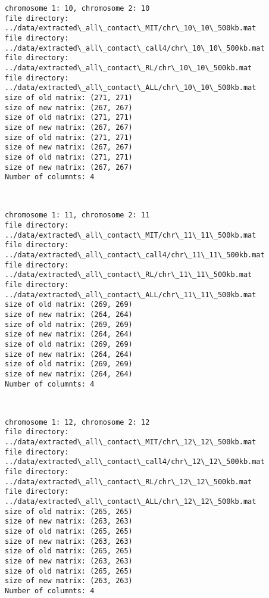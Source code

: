 \documentclass[11pt]{article}
\begin{document}
    \begin{Verbatim}[commandchars=\\\{\}]
chromosome 1: 10, chromosome 2: 10
file directory: ../data/extracted\_all\_contact\_MIT/chr\_10\_10\_500kb.mat
file directory: ../data/extracted\_all\_contact\_call4/chr\_10\_10\_500kb.mat
file directory: ../data/extracted\_all\_contact\_RL/chr\_10\_10\_500kb.mat
file directory: ../data/extracted\_all\_contact\_ALL/chr\_10\_10\_500kb.mat
size of old matrix: (271, 271)
size of new matrix: (267, 267)
size of old matrix: (271, 271)
size of new matrix: (267, 267)
size of old matrix: (271, 271)
size of new matrix: (267, 267)
size of old matrix: (271, 271)
size of new matrix: (267, 267)
Number of columnts: 4

    \end{Verbatim}

    \begin{center}
    \end{center}
    { \hspace*{\fill} \\}
    
    \begin{Verbatim}[commandchars=\\\{\}]
chromosome 1: 11, chromosome 2: 11
file directory: ../data/extracted\_all\_contact\_MIT/chr\_11\_11\_500kb.mat
file directory: ../data/extracted\_all\_contact\_call4/chr\_11\_11\_500kb.mat
file directory: ../data/extracted\_all\_contact\_RL/chr\_11\_11\_500kb.mat
file directory: ../data/extracted\_all\_contact\_ALL/chr\_11\_11\_500kb.mat
size of old matrix: (269, 269)
size of new matrix: (264, 264)
size of old matrix: (269, 269)
size of new matrix: (264, 264)
size of old matrix: (269, 269)
size of new matrix: (264, 264)
size of old matrix: (269, 269)
size of new matrix: (264, 264)
Number of columnts: 4

    \end{Verbatim}

    \begin{center}
    \end{center}
    { \hspace*{\fill} \\}
    
    \begin{Verbatim}[commandchars=\\\{\}]
chromosome 1: 12, chromosome 2: 12
file directory: ../data/extracted\_all\_contact\_MIT/chr\_12\_12\_500kb.mat
file directory: ../data/extracted\_all\_contact\_call4/chr\_12\_12\_500kb.mat
file directory: ../data/extracted\_all\_contact\_RL/chr\_12\_12\_500kb.mat
file directory: ../data/extracted\_all\_contact\_ALL/chr\_12\_12\_500kb.mat
size of old matrix: (265, 265)
size of new matrix: (263, 263)
size of old matrix: (265, 265)
size of new matrix: (263, 263)
size of old matrix: (265, 265)
size of new matrix: (263, 263)
size of old matrix: (265, 265)
size of new matrix: (263, 263)
Number of columnts: 4

    \end{Verbatim}
\end{document}
